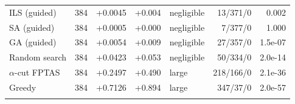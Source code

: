 \begin{table}[htbp]
\begin{tabular}{lrrrlrr}
ILS (guided) & 384 & +0.0045 & +0.004 & negligible & 13/371/0 & 0.002 \\
SA (guided) & 384 & +0.0005 & +0.000 & negligible & 7/377/0 & 1.000 \\
GA (guided) & 384 & +0.0054 & +0.009 & negligible & 27/357/0 & 1.5e-07 \\
Random search & 384 & +0.0423 & +0.053 & negligible & 50/334/0 & 2.0e-14 \\
$\alpha$-cut FPTAS & 384 & +0.2497 & +0.490 & large & 218/166/0 & 2.1e-36 \\
Greedy & 384 & +0.7126 & +0.894 & large & 347/37/0 & 2.0e-57 \\
\botrule
\end{tabular}
\end{table}
